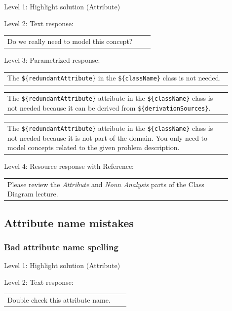 \noindent Level 1: Highlight solution (Attribute) \medskip

\noindent Level 2: Text response: \medskip

\begin{tabular}{|p{0.9\linewidth}}
Do we really need to model this concept?
\end{tabular} \medskip

\noindent Level 3: Parametrized response: \medskip

\begin{tabular}{|p{0.9\linewidth}}
The \verb|${redundantAttribute}| in the \verb|${className}| class is not needed.
\end{tabular} \medskip

\begin{tabular}{|p{0.9\linewidth}}
The \verb|${redundantAttribute}| attribute in the \verb|${className}| class is not needed because it can be derived from \verb|${derivationSources}|.
\end{tabular} \medskip

\begin{tabular}{|p{0.9\linewidth}}
The \verb|${redundantAttribute}| attribute in the \verb|${className}| class is not needed because it is not part of the domain. You only need to model concepts related to the given problem description.
\end{tabular} \medskip

\noindent Level 4: Resource response with Reference: \medskip

\begin{tabular}{|p{0.9\linewidth}}
Please review the \textit{Attribute} and \textit{Noun Analysis} parts of the Class Diagram lecture.
\end{tabular} \medskip


\subsection{Attribute name mistakes}

\subsubsection{Bad attribute name spelling}

\noindent Level 1: Highlight solution (Attribute) \medskip

\noindent Level 2: Text response: \medskip

\begin{tabular}{|p{0.9\linewidth}}
Double check this attribute name.
\end{tabular} \medskip


